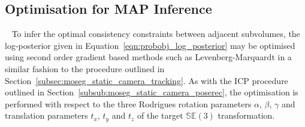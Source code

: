 \subsection{Optimisation for MAP Inference}
~\label{subsec:probobj_map_optimisation}
To infer the optimal consistency constraints between adjacent subvolumes, the
log-posterior given in Equation~\ref{eqn:probobj_log_posterior} may be optimised
using second order gradient based methods such as Levenberg-Marquardt in a similar 
fashion to the procedure outlined in Section~\ref{subsec:moseg_static_camera_tracking}. 
As with the ICP procedure outlined in Section~\ref{subsub:moseg_static_camera_poserec},
the optimisation is performed with respect to the three Rodrigues rotation
parameters \( \alpha \), \( \beta \), \( \gamma \) and translation parameters \(t_{x}\),
\(t_{y}\) and \(t_{z}\) of the target \(\mathbb{SE}(3)\) transformation.

